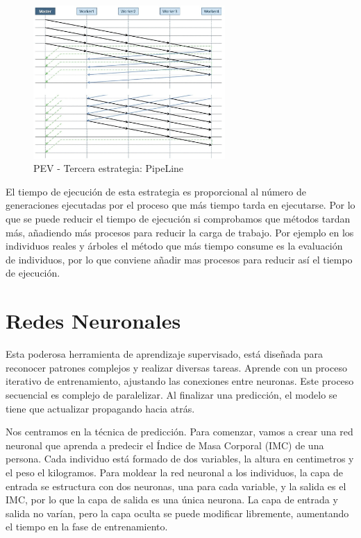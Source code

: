 	
		
	\begin{figure}[!h]
		\centering
		\includegraphics[width=0.65\textwidth]{images/chapter_3/pev_mpi3}
		\caption{PEV - Tercera estrategia: PipeLine }
		\label{fig:pevpipe}
	\end{figure}

	El tiempo de ejecución de esta estrategia es proporcional al número de generaciones ejecutadas por el proceso que más tiempo tarda en ejecutarse. Por lo que se puede reducir el tiempo de ejecución si comprobamos que métodos tardan más, añadiendo más procesos para reducir la carga de trabajo. Por ejemplo en los individuos reales y árboles el método que más tiempo consume es la evaluación de individuos, por lo que conviene añadir mas procesos para reducir así el tiempo de ejecución.
	
	
	
	
	
\newpage

\section{Redes Neuronales}
\label{sec:redes_neu}	
	Esta poderosa herramienta de aprendizaje supervisado, está diseñada para reconocer patrones complejos y realizar diversas tareas. Aprende con un proceso iterativo de entrenamiento, ajustando las conexiones entre neuronas. Este proceso secuencial es complejo de paralelizar. Al finalizar una predicción, el modelo se tiene que actualizar propagando hacia atrás.
	
	Nos centramos en la técnica de predicción. Para comenzar, vamos a crear una red neuronal que aprenda a predecir el Índice de Masa Corporal (IMC) de una persona. Cada individuo está formado de dos variables, la altura en centimetros y el peso el kilogramos. Para moldear la red neuronal a los individuos, la capa de entrada se estructura con dos neuronas, una para cada variable, y la salida es el IMC, por lo que la capa de salida es una única neurona. La capa de entrada y salida no varían, pero la capa oculta se puede modificar libremente, aumentando el tiempo en la fase de entrenamiento.
	
